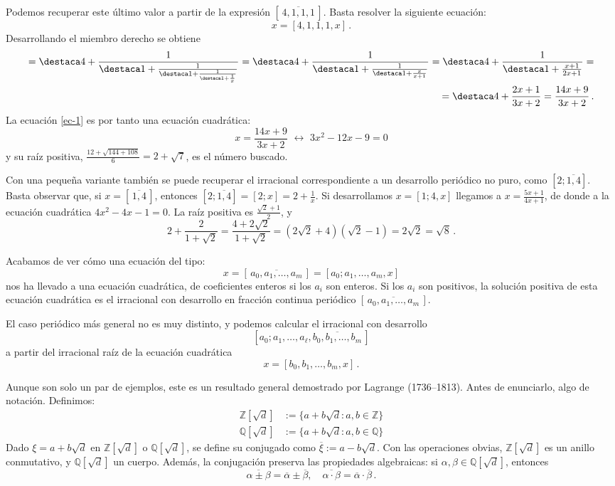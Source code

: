 Podemos recuperar este último valor a partir de la expresión $[\,\overline{4,1,1,1}\,]$. Basta resolver la siguiente ecuación:
\begin{equation}
x=[4,1,1,1,x]\,.\label{ec-1}
\end{equation}
Desarrollando el miembro derecho se obtiene
\begin{align*}
[4,1,1,1,x]=\destaca4+\frac1{\destaca1+\frac{1}{\destaca1+\frac{1}{\destaca1+\frac1x}}}
=
\destaca4+\frac1{\destaca1+\frac{1}{\destaca1+\frac{x}{x+1}}}
=
\destaca4+\frac1{\destaca1+\frac{x+1}{2x+1}}
=\\=
\destaca4+\frac{2x+1}{3x+2}=
\frac{14x+9}{3x+2}\,.
\end{align*}
La ecuación \eqref{ec-1} es por tanto una ecuación cuadrática:
$$ x= \frac{14x+9}{3x+2} \,\,\longleftrightarrow\,\,3x^2-12x-9=0$$
y su raíz positiva, $\frac{12+\sqrt{144+108}}6=2+\sqrt7$, es el número buscado.

Con una pequeña variante también se puede recuperar el irracional correspondiente a un desarrollo periódico no puro, como $[2;\overline{1,4}]$. Basta observar que, si $x=[\,\overline{1,4}\,]$, entonces $[2;\overline{1,4}]=[2;x]=2+\frac1x$. Si desarrollamos $x=[1;4,x]$ llegamos a $x=\frac{5x+1}{4x+1}$, de donde a la ecuación cuadrática $4x^2-4x-1=0$. La raíz positiva es $\frac{\sqrt2+1}2$, y 
$$
2+\frac2{1+\sqrt2}=\frac{4+2\sqrt2}{1+\sqrt2}=
(2\sqrt2+4)(\sqrt2-1)=2\sqrt2=\sqrt8\,.
$$

Acabamos de ver cómo una ecuación del tipo:
$$
x=[\,\overline{a_0,a_1,\dots,a_m}\,]=[a_0;a_1,\dots,a_m,x]
$$
nos ha llevado a una ecuación cuadrática, de coeficientes enteros si los $a_i$ son enteros. Si los $a_i$ son positivos, la solución positiva de esta ecuación cuadrática es el irracional con desarrollo en fracción continua periódico $[\,\overline{a_0,a_1,\dots,a_m}\,]$.

El caso periódico más general no es muy distinto, y podemos calcular el irracional con desarrollo 
$$
[a_0;a_1,\dots,a_\ell,\overline{b_0,b_1,\dots,b_m}\,]
$$
a partir del irracional raíz de la ecuación cuadrática
$$x=[b_0,b_1,\dots,b_m,x]\,.$$

Aunque son solo un par de ejemplos, este es un resultado general demostrado por Lagrange (1736--1813). Antes de enunciarlo, algo de notación. Definimos:
\begin{align*}
\mathbb Z[\sqrt d]&:=\big\{a+b\sqrt d: a,b\in\mathbb Z\big\}\\
\mathbb Q[\sqrt d]&:=\big\{a+b\sqrt d: a,b\in\mathbb Q\big\}
\end{align*}
Dado $\xi=a+b\sqrt d$ en $\mathbb Z[\sqrt d]$ o $\mathbb Q[\sqrt d]$, se define su conjugado como $\overline\xi:=a-b\sqrt d$. Con las operaciones obvias, $\mathbb Z[\sqrt d]$ es un anillo conmutativo, y $\mathbb Q[\sqrt d]$ un cuerpo. Además, la conjugación preserva las propiedades algebraicas: si $\alpha,\beta\in\mathbb Q[\sqrt d]$, entonces
$$
\overline{\alpha\pm\beta}=\overline\alpha\pm\overline\beta,\quad
\overline{\alpha\cdot\beta}=\overline\alpha\cdot\overline\beta\,.
$$

